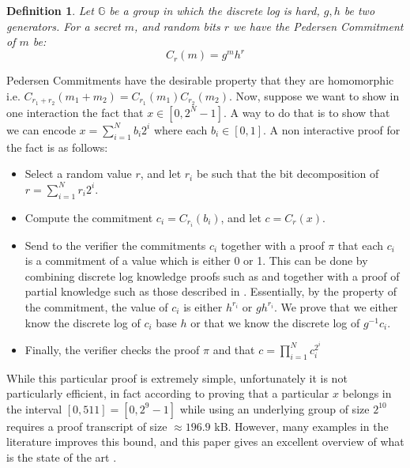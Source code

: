 \documentclass{article}
\newtheorem{definition}{Definition}
\begin{document}
\begin{definition}
    Let $\mathbb{G}$ be a group in which the discrete log is hard, $g, h$ be two generators. 
    For a secret $m$, and random bits $r$ we have the Pedersen Commitment of $m$ be:
    \[ C_r(m) = g^m h^r \]
\end{definition}
Pedersen Commitments have the desirable property that they are homomorphic i.e. $C_{r_1 + r_2}(m_1 + m_2) = C_{r_1}(m_1) C_{r_2}(m_2)$.
Now, suppose we want to show in one interaction the fact that $x \in [0, 2^N -1]$. A way to do that is to show
that we can encode $x =\sum^N_{i=1} b_i 2^i$ where each $b_i \in [0, 1]$. A non interactive proof \cite{maoGuaranteedCorrectSharing1998b} for the fact is as follows:
\begin{itemize}
    \item Select a random value $r$, and let $r_i$ be such that the bit decomposition of $r = \sum_{i = 1}^N r_i 2^i$.
    \item Compute the commitment $c_i = C_{r_i}(b_i)$, and let $c = C_r(x)$.
    \item Send to the verifier the commitments $c_i$ together with a proof $\pi$ that each $c_i$ is a commitment of a value which is either 0 or 1. This can 
    be done by combining discrete log knowledge proofs such as \cite{schnorrEfficientSignatureGeneration1991} and together with a proof of partial knowledge such as those
    described in \cite{cramerProofsPartialKnowledge1994}. Essentially, by the property of the commitment, the value 
    of $c_i$ is either $h^{r_i}$ or $g h^{r_i}$. We prove that we either know the discrete log of $c_i$ base $h$ or that we know 
    the discrete log of $g^{-1} c_i$.
    \item Finally, the verifier checks the proof $\pi$ and that $c = \prod_{i=1}^N c_i^{2^i}$
\end{itemize}

While this particular proof is extremely simple, unfortunately it is not particularly efficient, in fact according to \cite{boudotEfficientProofsThat2000}
proving that a particular $x$ belongs in the interval $[0, 511] = [0, 2^9 -1]$ while using an underlying group of size $2^{10}$ requires a proof 
transcript of size $\approx 196.9$ kB. However, many examples in the literature improves this bound, and this paper gives 
an excellent overview of what is the state of the art \cite{moraisSurveyZeroKnowledge2019}.


\appendix
\end{document}
